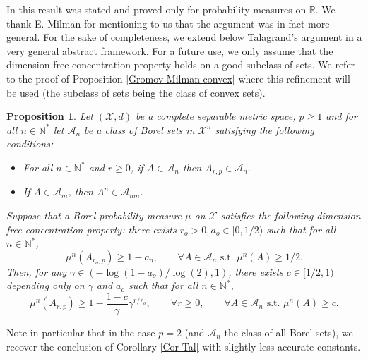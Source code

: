 \documentclass[11pt]{amsart}
\newtheorem{prop}[equation]{Proposition}
\numberwithin{equation}{section}
\begin{document}
In \cite{Tal91} this result was stated and proved only for probability measures on ${\mathbb{R}}$. We thank E. Milman for mentioning to us that the argument was in fact more general. 
For the sake of completeness, we extend below Talagrand's argument in a very general abstract framework. For a future use, we only assume that the dimension free concentration property holds on a good subclass of sets. We refer to the proof of Proposition \ref{Gromov Milman convex} where this refinement will be used (the subclass of sets being the class of convex sets). 

\begin{prop}\label{Cor Tal 2}
Let $({\mathcal{X}},d)$ be a complete separable metric space, $p\geq 1$ and for all $n\in {\mathbb{N}}^*$ let $\mathcal{A}_n$ be a class of Borel sets in ${\mathcal{X}}^n$ satisfying the following conditions:
\begin{itemize}
\item[(i)] For all $n\in {\mathbb{N}}^*$ and $r\geq 0$, if $A\in \mathcal{A}_n$ then $A_{r,p}\in \mathcal{A}_n.$
\item[(ii)] If $A\in \mathcal{A}_m$, then $A^n\in \mathcal{A}_{nm}.$ 
\end{itemize}
Suppose that a Borel probability measure $\mu$ on ${\mathcal{X}}$ satisfies the following dimension free concentration property: there exists $r_o>0,a_o\in[0,1/2)$ such that for all $n\in {\mathbb{N}}^*$, 
\[
\mu^n(A_{r_o,p})\geq 1-a_o,\qquad \forall A \in \mathcal{A}_n \text{ s.t. } \mu^n(A)\geq 1/2.
\]
Then, for any $\gamma \in ( -\log(1-a_o)/\log(2), 1)$, there exists $c\in [1/2,1)$ depending only on $\gamma$ and $a_o$ such that for all $n\in {\mathbb{N}}^*$,
\[
\mu^n(A_{r,p}) \geq 1- \frac{1-c}{\gamma} \gamma^{r/r_o},\qquad \forall r\geq0,\qquad \forall A \in \mathcal{A}_n \text{ s.t. } \mu^n(A)\geq c.
\]
\end{prop}
Note in particular that in the case $p=2$ (and $\mathcal{A}_n$ the class of all Borel sets), we recover the conclusion of Corollary \ref{Cor Tal} with slightly less accurate constants. 
\end{document}
